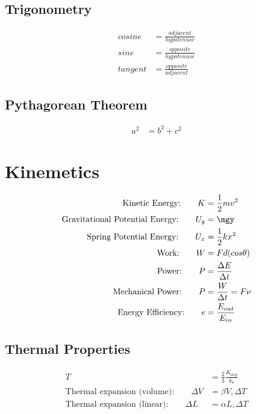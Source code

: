 \documentclass[]{article}
\begin{document}
\subsection{Trigonometry}

\begin{align*}
	cosine &= \frac{adjacent}{hypotenuse} \\
	sine &= \frac{opposite}{hypotenuse} \\
	tangent &= \frac{opposite}{adjacent}
\end{align*}

\subsection{Pythagorean Theorem}

\begin{align*}
	a^2 &= b^2 +c^2
\end{align*} 


\section{Kinemetics}

\begin{align*}
	\text{Kinetic Energy:} \qquad K &= \frac{1}{2} mv^2 \\
	\text{Gravitational Potential Energy:} \qquad U_g &= \mgy \\
	\text{Spring Potential Energy:} \qquad U_x &= \frac{1}{2} kx^2 \\
	\text{Work:} \qquad W &= F d (cos \theta) \\
	\text{Power:} \qquad P &= \frac{\Delta E}{\Delta t} \\
	\text{Mechanical Power:} \qquad P &= \frac{W}{\Delta t} = F \nu \\
\text{Energy Efficiency:} \qquad e &= \frac{E_{out}}{E_{in}} \\
\end{align*} 

\subsection{Thermal Properties}

\begin{align*}
T &= \frac{2}{3} \frac{K_{avg}}{k_b} \\
\text{Thermal expansion (volume):} \qquad \Delta V &= \beta V, \Delta T \\
\text{Thermal expansion (linear):} \qquad \Delta L &= \alpha L, \Delta T \\
\end{align*} 
\end{document}
